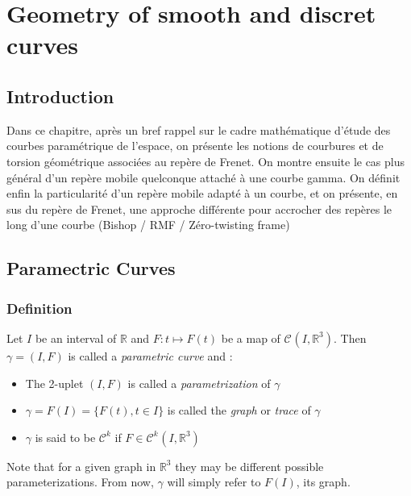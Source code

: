 \chapter{Geometry of smooth and discret curves}
\section{Introduction}
Dans ce chapitre, après un bref rappel sur le cadre mathématique d'étude des courbes paramétrique de l'espace, on présente les notions de courbures et de torsion géométrique associées au repère de Frenet. On montre ensuite le cas plus général d'un repère mobile quelconque attaché à une courbe gamma. On définit enfin la particularité d'un repère mobile adapté à un courbe, et on présente, en sus du repère de Frenet, une approche différente pour accrocher des repères le long d'une courbe (Bishop / RMF / Zéro-twisting frame)



\section{Paramectric Curves}

\subsection{Definition}
Let $I$ be an interval \cite{Bishop1975} of $\mathbb{R}$ and $F\colon t \mapsto F(t)$ be a map of ${\mathcal{C}}^{}(I,{\mathbb{R}}^3)$. Then $\gamma=(I,F)$ is called a \emph{parametric curve} and :
\begin{itemize}
\item The 2-uplet $(I,F)$ is called a \emph{parametrization} of $\gamma$
\item $\gamma = F(I) = \{F(t), t \in I\}$ is called the \emph{graph} or \emph{trace} of $\gamma$
\item $\gamma$ is said to be ${\mathcal{C}}^{k}$ if $F \in {\mathcal{C}^{k}}^{}(I,{\mathbb{R}}^3)$
\end{itemize}

\begin{myrk}
Note that for a given graph in ${\mathbb{R}}^3$ they may be different possible parameterizations. From now, $\gamma$ will simply refer to $F(I)$, its graph.
\end{myrk}


